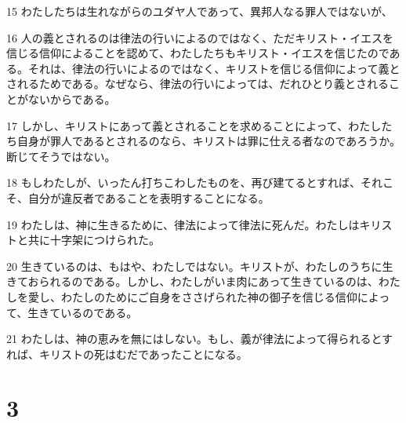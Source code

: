 \par 15 わたしたちは生れながらのユダヤ人であって、異邦人なる罪人ではないが、
\par 16 人の義とされるのは律法の行いによるのではなく、ただキリスト・イエスを信じる信仰によることを認めて、わたしたちもキリスト・イエスを信じたのである。それは、律法の行いによるのではなく、キリストを信じる信仰によって義とされるためである。なぜなら、律法の行いによっては、だれひとり義とされることがないからである。
\par 17 しかし、キリストにあって義とされることを求めることによって、わたしたち自身が罪人であるとされるのなら、キリストは罪に仕える者なのであろうか。断じてそうではない。
\par 18 もしわたしが、いったん打ちこわしたものを、再び建てるとすれば、それこそ、自分が違反者であることを表明することになる。
\par 19 わたしは、神に生きるために、律法によって律法に死んだ。わたしはキリストと共に十字架につけられた。
\par 20 生きているのは、もはや、わたしではない。キリストが、わたしのうちに生きておられるのである。しかし、わたしがいま肉にあって生きているのは、わたしを愛し、わたしのためにご自身をささげられた神の御子を信じる信仰によって、生きているのである。
\par 21 わたしは、神の恵みを無にはしない。もし、義が律法によって得られるとすれば、キリストの死はむだであったことになる。

\chapter{3}

